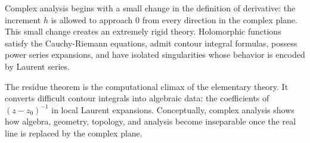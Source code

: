 Complex analysis begins with a small change in the definition of derivative: the increment $h$ is allowed to approach $0$ from every direction in the complex plane. This small change creates an extremely rigid theory. Holomorphic functions satisfy the Cauchy-Riemann equations, admit contour integral formulas, possess power series expansions, and have isolated singularities whose behavior is encoded by Laurent series.

The residue theorem is the computational climax of the elementary theory. It converts difficult contour integrals into algebraic data: the coefficients of $(z-z_0)^{-1}$ in local Laurent expansions. Conceptually, complex analysis shows how algebra, geometry, topology, and analysis become inseparable once the real line is replaced by the complex plane.
